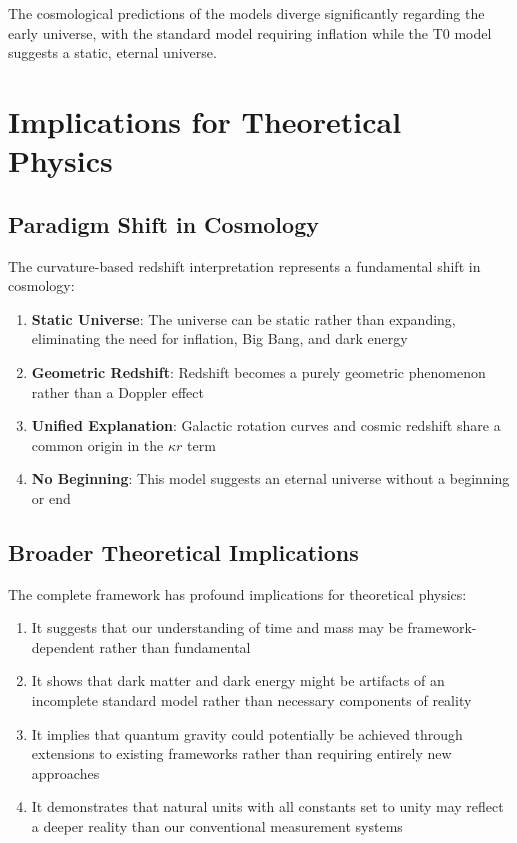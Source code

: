 \documentclass[12pt,a4paper]{article}
\begin{document}
	The cosmological predictions of the models diverge significantly regarding the early universe, with the standard model requiring inflation while the T0 model suggests a static, eternal universe.
	
	\section{Implications for Theoretical Physics}
	
	\subsection{Paradigm Shift in Cosmology}
	
	The curvature-based redshift interpretation represents a fundamental shift in cosmology:
	
	\begin{enumerate}
		\item \textbf{Static Universe}: The universe can be static rather than expanding, eliminating the need for inflation, Big Bang, and dark energy
		\item \textbf{Geometric Redshift}: Redshift becomes a purely geometric phenomenon rather than a Doppler effect
		\item \textbf{Unified Explanation}: Galactic rotation curves and cosmic redshift share a common origin in the $\kappa r$ term
		\item \textbf{No Beginning}: This model suggests an eternal universe without a beginning or end
	\end{enumerate}
	
	\subsection{Broader Theoretical Implications}
	
	The complete framework has profound implications for theoretical physics:
	
	\begin{enumerate}
		\item It suggests that our understanding of time and mass may be framework-dependent rather than fundamental
		\item It shows that dark matter and dark energy might be artifacts of an incomplete standard model rather than necessary components of reality
		\item It implies that quantum gravity could potentially be achieved through extensions to existing frameworks rather than requiring entirely new approaches
		\item It demonstrates that natural units with all constants set to unity may reflect a deeper reality than our conventional measurement systems
	\end{enumerate}
	
\end{document}
